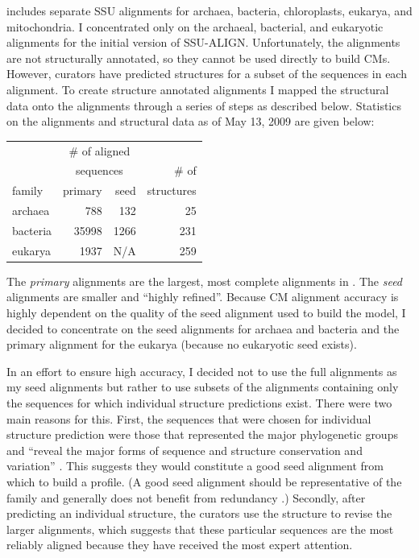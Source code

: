  includes separate SSU alignments for archaea, bacteria,
chloroplasts, eukarya, and mitochondria. I concentrated only
on the archaeal, bacterial, and eukaryotic alignments for the initial
version of SSU-ALIGN.  Unfortunately, the  alignments
are not structurally annotated, so they cannot be used directly to
build CMs. However,  curators have predicted structures for a
subset of the sequences in each alignment.  To create structure
annotated alignments I mapped the structural data onto the alignments
through a series of steps as described below.  Statistics on the
 alignments and structural data as of May 13, 2009 are given
below:

\begin{center}
\begin{tabular}{l|rr|r}
       & \multicolumn{2}{c|}{\# of aligned}& \\
       & \multicolumn{2}{c|}{sequences}    & \# of \\ \cline {2-3}
family & primary & seed                   & structures \\ \hline
archaea&     788 &  132                   & 25 \\
bacteria&  35998 & 1266                   & 231 \\
eukarya&    1937 & N/A                    & 259 \\
\end{tabular}
\end{center}

The {\em primary} alignments are the largest, most complete alignments
in . The {\em seed} alignments are smaller and ``highly
refined''. Because CM alignment accuracy is highly dependent on the
quality of the seed alignment used to build the model, I decided to
concentrate on the seed alignments for archaea and bacteria and the
primary alignment for the eukarya (because no eukaryotic seed exists).

In an effort to ensure high accuracy, I decided not to
use the full  alignments as my seed alignments but rather to use
subsets of the alignments containing only the sequences for which
individual structure predictions exist.  There were two main reasons
for this. First, the sequences that were chosen for individual
structure prediction were those that represented the major
phylogenetic groups and ``reveal the major forms of sequence and
structure conservation and variation'' \cite{CannoneGutell02}. This
suggests they would constitute a good seed alignment from which to
build a profile. (A good seed alignment should be representative of
the family and generally does not benefit from redundancy
\cite{Durbin98}.) Secondly, after predicting an individual structure,
the  curators use the structure to revise the larger alignments,
which suggests that these particular sequences are the most reliably
aligned because they have received the most expert attention.

